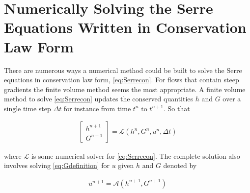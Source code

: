 \documentclass[SingleSpace,12pt]{Serre_ASCE}
\begin{document}
\section{Numerically Solving the Serre Equations Written in Conservation Law Form}
\label{section:Solving the Serre Equations Written in Conservation Law Form}
There are numerous ways a numerical method could be built to solve the Serre equations in conservation law form, \eqref{eq:Serrecon}. For flows that contain steep gradients the finite volume method seems the most appropriate. A finite volume method to solve \eqref{eq:Serrecon} updates the conserved quantities $h$ and $G$ over a single time step $\Delta t$ for instance from time $t^n$ to $t^{n+1}$. So that
\begin{linenomath*}
\begin{gather}
\left[\begin{array}{c}
 h^{n+1} \\
 G^{n+1} \end{array}\right] = \mathcal{L}(h^{n},G^{n},u^n,\Delta t)
\label{eq:L}
\end{gather}
\end{linenomath*}
where $\mathcal{L}$ is some numerical solver for \eqref{eq:Serrecon}. The complete solution also involves solving \eqref{eq:Gdefinition} for $u$ given $h$ and $G$ denoted by 
\begin{linenomath*}
\begin{gather}
u^{n+1} = \mathcal{A}(h^{n+1},G^{n+1})
\label{eq:A}
\end{gather}
\end{linenomath*}
\end{document}
